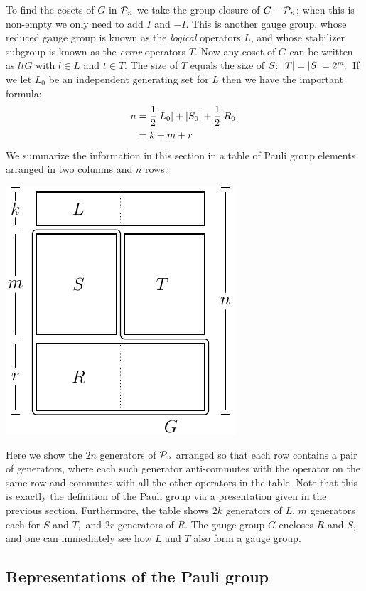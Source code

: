 \documentclass[12pt]{article}
\begin{document}
To find the cosets of $G$ in $\mathcal{P}_n$ we take
the group closure of $G-\mathcal{P}_n$; when this is non-empty
we only need to add $I$ and $-I.$
This is another
gauge group, whose reduced gauge group is known as
the {\it logical} operators $L$, and whose 
stabilizer subgroup is known as the {\it error} operators $T.$
Now any coset of $G$ can be written as $ltG$ with
$l\in L$ and $t\in T.$
The size of $T$ equals the size of $S$: $|T|=|S|=2^m.$
If we let $L_0$ be an independent generating set for $L$
then we have the important formula:
\begin{align}
n &= \frac{1}{2}|L_0| + |S_0| + \frac{1}{2}|R_0|\\
  &= k + m + r
\end{align}
We summarize the information in this section in a table
of Pauli group elements arranged in
two columns and $n$ rows:
\begin{center}
\includegraphics[]{pic-canonical.pdf}
\end{center}
Here we show the $2n$ generators of $\mathcal{P}_n$ arranged 
so that each row contains a pair of generators,
where each such generator anti-commutes with the operator on the same row and
commutes with all the other operators in the table.
Note that this is exactly the definition of the Pauli group
via a presentation given in the previous section.
Furthermore, the table shows $2k$ generators
of $L$, $m$ generators each for $S$ and $T,$ and $2r$
generators of $R.$
The gauge group $G$ encloses $R$ and $S$, and one can
immediately see how $L$ and $T$ also form a gauge group.


\subsection{Representations of the Pauli group}
\end{document}
